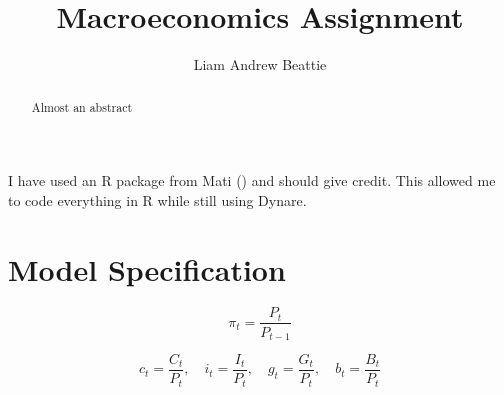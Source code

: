 \documentclass[11pt,preprint]{elsarticle}
\numberwithin{equation}{section}
\numberwithin{figure}{section}
\numberwithin{table}{section}
\begin{document}
\begin{frontmatter}  %

\title{Macroeconomics Assignment}





\author[Add1]{Liam Andrew Beattie}





\address[Add1]{Macroeconomics 871, Stellenbosch University, South
Africa}


\begin{abstract}
\small{
Almost an abstract
}
\end{abstract}

\vspace{1cm}





\vspace{0.5cm}

\end{frontmatter}

\setcounter{footnote}{0}



\pagestyle{fancy}
\chead{}
\rhead{}
\lfoot{}
\lhead{}
\cfoot{}


\headsep 35pt %




I have used an R package from Mati () and
should give credit. This allowed me to code everything in R while still
using Dynare.

\section{Model Specification}\label{model-specification}

\begin{equation}
\pi_t = \frac{P_t}{P_{t-1}}
\label{inflation}
\end{equation}

\begin{equation}
c_t = \frac{C_t}{P_t}, 
\quad i_t = \frac{I_t}{P_t}, 
\quad g_t = \frac{G_t}{P_t},
\quad b_t = \frac{B_t}{P_t}
\label{real_conversions}
\end{equation}
\end{document}
